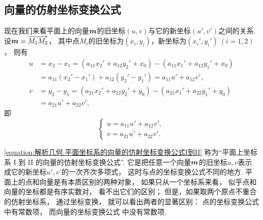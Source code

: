 \subsection{向量的仿射坐标变换公式}
\begin{figure}[hbt]
	\centering
	\caption{}
\end{figure}

现在我们来看平面上的向量\(\boldsymbol{m}\)的旧坐标\((u,v)\)与它的新坐标\((u',v')\)之间的关系.
设\(\boldsymbol{m}=\overrightarrow{M_1 M_2}\)，
其中点\(M_i\)的旧坐标为\((x_i,y_i)\)，新坐标为\((x_i',y_i')\ (i=1,2)\)，
则有\begin{align*}
	u &= x_2 - x_1
	= (a_{11} x_2' + a_{12} y_2' + x_0)
	- (a_{11} x_1' + a_{12} y_1' + x_0) \\
	&= a_{11} (x_2' - x_1')
	+ a_{12} (y_2' - y_1')
	= a_{11} u' + a_{12} v', \\
	v &= y_2 - y_1
	= (a_{21} x_2' + a_{22} y_2' + y_0)
	- (a_{21} x_1' + a_{22} y_1' + y_0) \\
	&= a_{21} u' + a_{22} v',
\end{align*}
即\begin{equation}\label{equation:解析几何.平面坐标系的向量的仿射坐标变换公式I到II}
	\left\{ \begin{array}{l}
		u = a_{11} u' + a_{12} v', \\
		v = a_{21} u' + a_{22} v'.
	\end{array} \right.
\end{equation}

\cref{equation:解析几何.平面坐标系的向量的仿射坐标变换公式I到II}
称为“平面上坐标系 I 到 II 的向量的仿射坐标变换公式”.
它是把任意一个向量\(\boldsymbol{m}\)的旧坐标\(u,v\)表示成它的新坐标\(u',v'\)的一次齐次多项式，
这时与点的坐标变换公式不同的地方.
平面上的点和向量是有本质区别的两种对象，
如果只从一个坐标系来看，
似乎点和向量的坐标都是有序实数对，
看不出它们的区别；
但是，如果取两个原点不重合的仿射坐标系，
通过坐标变换，
就可以看出两者的显著区别：
点的坐标变换公式  中有常数项，
而向量的坐标变换公式  中没有常数项.

